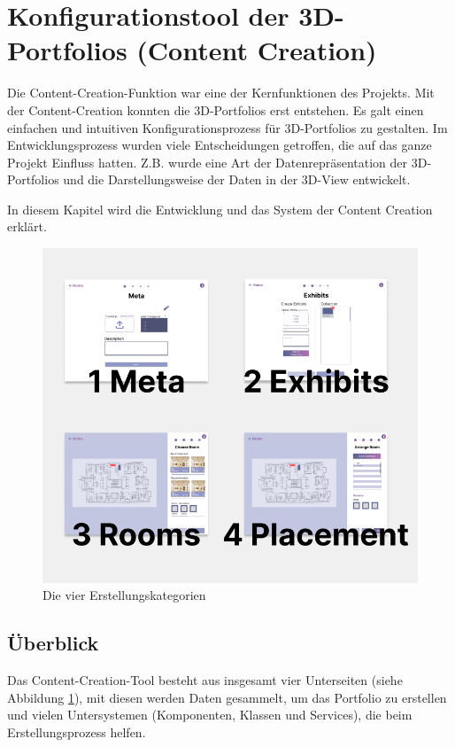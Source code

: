 \section{Konfigurationstool der 3D-Portfolios (Content Creation)}

Die Content-Creation-Funktion war eine der Kernfunktionen des Projekts. Mit der Content-Creation konnten die 3D-Portfolios erst entstehen. Es galt einen einfachen und intuitiven Konfigurationsprozess für 3D-Portfolios zu gestalten. Im Entwicklungsprozess wurden viele Entscheidungen getroffen, die auf das ganze Projekt Einfluss hatten. Z.B. wurde eine Art der Datenrepräsentation der 3D-Portfolios und die Darstellungsweise der Daten in der 3D-View entwickelt.

In diesem Kapitel wird die Entwicklung und das System der Content Creation erklärt.

\begin{figure}[h t]
    \centering
    \includegraphics[scale=0.5]{pics/CreateCreation4Categories.png}
    \caption{Die vier Erstellungskategorien}
    \label{fig:impl:creation:fourCategoires}
\end{figure}

\subsection{Überblick}
Das Content-Creation-Tool besteht aus insgesamt vier Unterseiten (siehe Abbildung \ref{fig:impl:creation:fourCategoires}), mit diesen werden Daten gesammelt, um das Portfolio zu erstellen und vielen Untersystemen (Komponenten, Klassen und Services), die beim Erstellungsprozess helfen.

